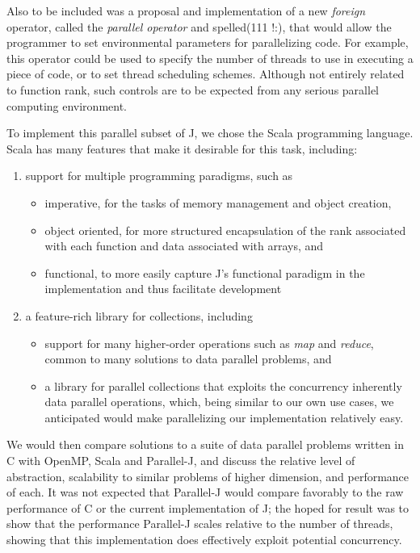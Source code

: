Also to be included was a proposal and implementation of a new \textit{foreign} operator, called the \textit{parallel operator} and spelled\ttfamily (111 !:)\normalfont , 
that would allow the programmer to set environmental parameters for parallelizing code.
For example, this operator could be used to specify the number of threads to use in executing a piece of code, 
or to set thread scheduling schemes.
Although not entirely related to function rank, such controls are to be expected from any serious parallel computing environment.

To implement this parallel subset of J, we chose the Scala programming language.\cite{scala} 
Scala has many features that make it desirable for this task, including: 
\begin{enumerate} 
	\item support for multiple programming paradigms, such as
	\begin{itemize}
		\item imperative, for the tasks of memory management and object creation,
		\item object oriented, for more structured encapsulation of the rank associated with each function 
			and data associated with arrays, and
		\item functional, to more easily capture J's functional paradigm in the implementation and thus facilitate development
	\end{itemize}
	\item a feature-rich library for collections, including 
	\begin{itemize}
		\item support for many higher-order operations such as \textit{map} and \textit{reduce}, \cite{scala28col}
			common to many solutions to data parallel problems, and
		\item a library for parallel collections that exploits the concurrency inherently data parallel operations,\cite{pc}
			which, being similar to our own use cases, we anticipated would make parallelizing our implementation relatively easy.
	\end{itemize}
\end{enumerate}

We would then compare solutions to a suite of data parallel problems written in C with OpenMP, Scala and Parallel-J,
and discuss the relative level of abstraction, scalability to similar problems of higher dimension, and performance of each. 
It was not expected that Parallel-J would compare favorably to the raw performance of C or the current implementation of J; 
the hoped for result was to show that the performance Parallel-J scales relative to the number of threads, 
showing that this implementation does effectively exploit potential concurrency.

